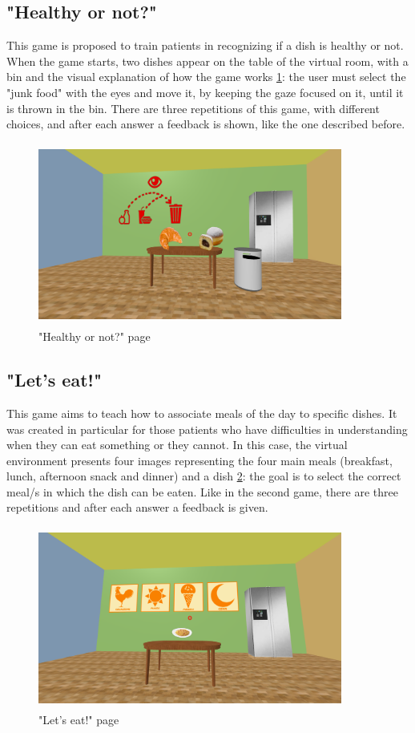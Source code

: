 \subsection{"Healthy or not?"}
This game is proposed to train patients in recognizing if a dish is healthy or not. When the game starts, two dishes appear on the table of the virtual room, with a bin and the visual explanation of how the game works \ref{fig:healthy}: the user must select the "junk food" with the eyes and move it, by keeping the gaze focused on it, until it is thrown in the bin. There are three repetitions of this game, with different choices, and after each answer a feedback is shown, like the one described before.\\
\begin{figure}[H]
\centering
\includegraphics[width=10cm, height=6cm]{immagini/Healthy.png}
\caption{"Healthy or not?" page}\label{fig:healthy}
\end{figure}
\subsection{"Let's eat!"}
This game aims to teach how to associate meals of the day to specific dishes. It was created in particular
for those patients who have difficulties in understanding when they can eat something or they cannot. In this case, the virtual environment presents four images representing the four main meals (breakfast, lunch, afternoon snack and dinner) and a dish \ref{fig:eat}: the goal is to select the correct meal/s in which the dish can be eaten. Like in the second game, there are three repetitions and after each answer a feedback is given.\\
\begin{figure}[H]
\centering
\includegraphics[width=10cm, height=6cm]{immagini/Eat.png}
\caption{"Let's eat!" page}\label{fig:eat}
\end{figure}

